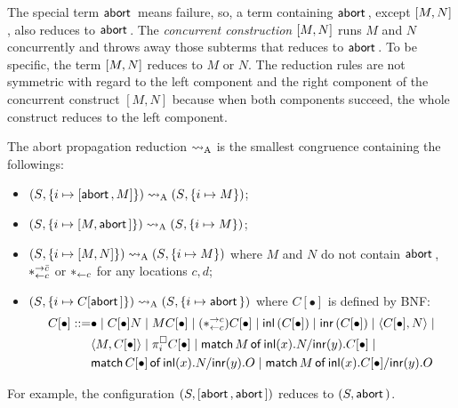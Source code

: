 The special term $\mathsf{abort\,}$ means failure, so, a term containing $\mathsf{abort\,}$,
except $[{M,N}]$, also reduces to $\mathsf{abort\,}$.  The \textit{concurrent
construction} $[{M,N}]$ runs $M$
and $N$ concurrently and throws
away those subterms that reduces to $\mathsf{abort\,}$.
To be specific, the term $[{M,N}]$ reduces to ${M}$
or ${N}$.
The reduction rules are not symmetric with regard to the left component
and the right component of the concurrent construct $[M,N]$ because
when both components succeed, the whole construct reduces to
the left component.
\begin{definition}
 The abort propagation reduction $\rightsquigarrow_{\mathrm A}$ is the smallest
 congruence containing the
 followings:
\begin{itemize}
 \item  $({S}{},{\{i\mapsto {[{\mathsf{abort\,}, M}]}\}})\rightsquigarrow_{\mathrm A}
 ({S}{},{\{i\mapsto {M}\}})$;
 \item
   $({S}{},{\{i\mapsto {[{M,\mathsf{abort\,}}]}\}})\rightsquigarrow_{\mathrm A}
 ({S}{},{\{i\mapsto {M}\}})$;
 \item $({S}{},{\{i\mapsto {[{M,N}]}\}})\rightsquigarrow_{\mathrm A} ({S}{},{\{i\mapsto {M}\}})$ where
       $M$ and $N$ do not contain $\mathsf{abort\,}$, $\ast^{\rightarrow {\bar{c}}}_{\leftarrow{c}}$ or $\ast_{\leftarrow{c}}$
       for any locations $c,d$;
 \item  $({S}{},{\{i\mapsto {C[\mathsf{abort\,}]}\}})\rightsquigarrow_{\mathrm A}
 ({S}{},{\{i\mapsto {\mathsf{abort\,}}\}})$  where $C[\bullet]$ is defined by BNF:
\begin{align*}
  C[\bullet] ::= &\bullet \mid
C[\bullet] N \mid
{M C[\bullet]}\mid
(\ast^{\rightarrow {c}}_{\leftarrow{c}})C[\bullet]\mid
\mathsf{inl}\left({C[\bullet]}\right)\mid
\mathsf{inr}\left({C[\bullet]}\right)\mid
\langle{C[\bullet], N}\rangle\mid \\&
\langle{M, C[\bullet]}\rangle\mid
\pi^\square_i{C[\bullet]}\mid
\mathsf{match}\,{M}\,\mathsf{of}\, \mathsf{inl}({x}). {N}/ \mathsf{inr}({y}). {C[\bullet]}\mid\\ &
\mathsf{match}\,{C[\bullet]}\,\mathsf{of}\, \mathsf{inl}({x}). {N}/ \mathsf{inr}({y}). {O}\mid
\mathsf{match}\,{M}\,\mathsf{of}\, \mathsf{inl}({x}). {C[\bullet]}/ \mathsf{inr}({y}). {O}
\end{align*}
\end{itemize}
\end{definition}
For example, the configuration $(S, [{\mathsf{abort\,},\mathsf{abort\,}}])$ reduces to $(S,
\mathsf{abort\,})$.

